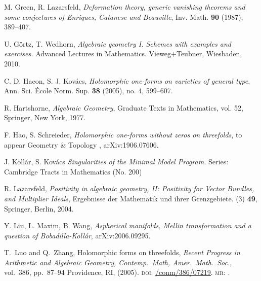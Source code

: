 \documentclass[a4paper,12pt,reqno]{amsart}
\theoremstyle{plain}
\theoremstyle{definition}
\theoremstyle{remark}
\begin{document}
\begin{thebibliography}{HKLR}
 M. Green, R. Lazarsfeld, \textit{Deformation theory, generic vanishing theorems and some conjectures of Enriques, Catanese and Beauville}, Inv. Math. \textbf{90} (1987), 389--407.

 U. G\"ortz, T. Wedhorn, \textit{Algebraic geometry I. Schemes with examples and exercises.} Advanced Lectures in Mathematics. Vieweg+Teubner, Wiesbaden, 2010. 

 C. D. Hacon, S. J. Kov\'acs, \textit{Holomorphic one-forms on varieties of general type}, Ann. Sci. \'Ecole Norm. Sup. \textbf{38} (2005), no. 4, 599--607.

 R. Hartshorne, \textit{Algebraic Geometry}, Graduate Texts in Mathematics, vol. 52, Springer, New York,
1977.

 F. Hao, S. Schreieder, \textit{Holomorphic one-forms without zeros on threefolds}, to appear Geometry $\&$ Topology , arXiv:1906.07606.

 J. Koll\'ar, S. Kov\'acs {\it Singularities of the Minimal Model Program.}
Series: Cambridge Tracts in Mathematics (No. 200)


 R. Lazarsfeld, \textit{Positivity in algebraic geometry, II: Positivity for Vector Bundles, and Multiplier Ideals}, Ergebnisse der Mathematik und ihrer Grenzgebiete. (3) \textbf{49}, Springer, Berlin, 2004.





 Y. Liu, L. Maxim, B. Wang, \textit{Aspherical manifolds, Mellin transformation and a question of Bobadilla-Koll\'ar}, arXiv:2006.09295.

 T.\ Luo and Q.\ Zhang, Holomorphic forms on threefolds, \textit{Recent Progress in Arithmetic and Algebraic Geometry, Contemp.\ Math, Amer.\ Math.\ Soc.}, vol.\ 386, pp.\ 87--94 Providence, RI, (2005). 
\textsc{doi}: \href{https://doi.org/org/10.1090/conm/386/07219}{/conm/386/07219}.
\textsc{mr}: \href{http://www.ams.org/mathscinet-getitem?mr=2182772}{}.


\end{thebibliography}
\end{document}
